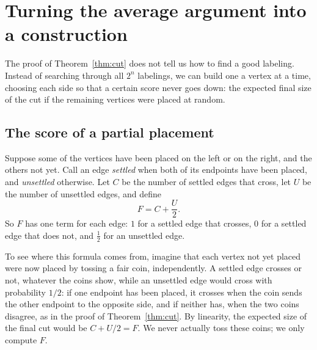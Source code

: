 \section{Turning the average argument into a construction}\label{ch13:sec:construction}
The proof of Theorem~\ref{thm:cut} does not tell us how to find a good labeling. Instead of searching through all $2^n$ labelings, we can build one a vertex at a time, choosing each side so that a certain score never goes down: the expected final size of the cut if the remaining vertices were placed at random.

\subsection*{The score of a partial placement}
Suppose some of the vertices have been placed on the left or on the right, and the others not yet. Call an edge \emph{settled} when both of its endpoints have been placed, and \emph{unsettled} otherwise. Let $C$ be the number of settled edges that cross, let $U$ be the number of unsettled edges, and define
\[
F=C+\frac U2.
\]
So $F$ has one term for each edge: $1$ for a settled edge that crosses, $0$ for a settled edge that does not, and $\tfrac12$ for an unsettled edge.

To see where this formula comes from, imagine that each vertex not yet placed were now placed by tossing a fair coin, independently. A settled edge crosses or not, whatever the coins show, while an unsettled edge would cross with probability $1/2$: if one endpoint has been placed, it crosses when the coin sends the other endpoint to the opposite side, and if neither has, when the two coins disagree, as in the proof of Theorem~\ref{thm:cut}. By linearity, the expected size of the final cut would be $C+U/2=F$. We never actually toss these coins; we only compute $F$.

